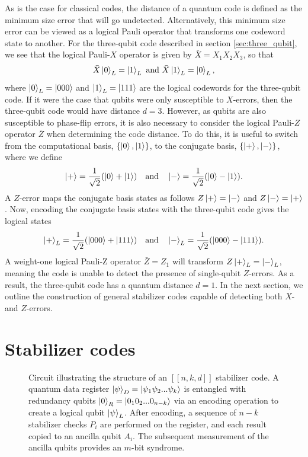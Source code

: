 \documentclass[]{arxiv}
\theoremstyle{plain}%
\theoremstyle{definition}
\theoremstyle{remark}
\begin{document}
As is the case for classical codes, the distance of a quantum code is defined as the minimum size error that will go undetected. Alternatively, this minimum size error can be viewed as a logical Pauli operator that transforms one codeword state to another. For the three-qubit code described in section \ref{sec:three_qubit}, we see that the logical Pauli-$X$ operator is given by $\bar{X}=X_1X_2X_3$, so that
%
\begin{equation}
\bar{X}\ket{0}_L=\ket{1}_L \ {\rm and} \ \bar{X}\ket{1}_L=\ket{0}_L\rm,
\end{equation}
%
where $\ket{0}_L=\ket{000}$ and $\ket{1}_L=\ket{111}$ are the logical codewords for the three-qubit code. If it were the case that qubits were only susceptible to $X$-errors, then the three-qubit code would have distance $d=3$. However, as qubits are also susceptible to phase-flip errors, it is also necessary to consider the logical Pauli-$Z$ operator $\bar{Z}$ when determining the code distance. To do this, it is useful to switch from the computational basis, $\{\ket{0},\ket{1}\}$, to the conjugate basis, $ \{\ket{+},\ket{-}\}$, where we define
%
\begin{equation}
\ket{+}=\dfrac{1}{\sqrt{2}}(\ket{0}+\ket{1}) \quad \text{and} \quad \ket{-}=\dfrac{1}{\sqrt{2}}(\ket{0}-\ket{1})\rm .
\end{equation}
%
A $Z$-error maps the conjugate basis states as follows $Z\ket{+}=\ket{-}$ and $Z\ket{-}=\ket{+}$. Now, encoding the conjugate basis states with the three-qubit code gives the logical states
%
\begin{equation}
\ket{+}_L=\dfrac{1}{\sqrt{2}}(\ket{000}+\ket{111}) \quad \text{and} \quad \ket{-}_L=\dfrac{1}{\sqrt{2}}(\ket{000}-\ket{111})\rm.
\end{equation}
%
A weight-one logical Pauli-Z operator $\bar{Z}=Z_1$ will transform $Z\ket{+}_L=\ket{-}_L$, meaning the code is unable to detect the presence of single-qubit $Z$-errors. As a result, the three-qubit code has a quantum distance $d=1$. In the next section, we outline the construction of general stabilizer codes capable of detecting both $X$- and $Z$-errors.




\section{Stabilizer codes} \label{sec:stab_codes}

\begin{figure}
	{ }
	\caption{Circuit illustrating the structure of an $[[n,k,d]] $ stabilizer code. A quantum data register $\ket{\psi}_D=\ket{\psi_{1}\psi_{2}...\psi_{k}}$ is entangled with redundancy qubits $\ket{0}_R=\ket{0_{1}0_{2}...0_{{n-k}}}$ via an encoding operation to create a logical qubit $\ket{\psi}_L$. After encoding, a sequence of $n-k$ stabilizer checks $P_i$ are performed on the register, and each result copied to an ancilla qubit $A_i$. The subsequent measurement of the ancilla qubits provides an $m$-bit syndrome.}
	\label{fig:stab_code}
\end{figure}
\end{document}
